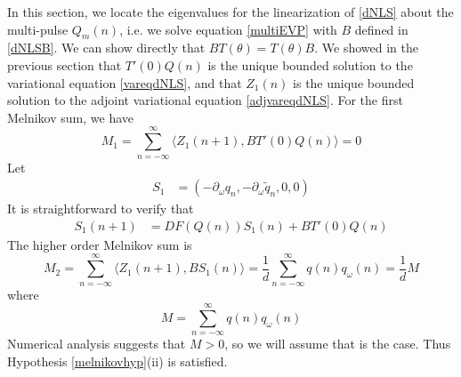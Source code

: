 \documentclass[12pt]{article}
\begin{document}
In this section, we locate the eigenvalues for the linearization of \eqref{dNLS} about the multi-pulse $Q_m(n)$, i.e. we solve equation \eqref{multiEVP} with $B$ defined in \eqref{dNLSB}. We can show directly that $B T(\theta) = T(\theta) B$. We showed in the previous section that $T'(0)Q(n)$ is the unique bounded solution to the variational equation \eqref{vareqdNLS}, and that $Z_1(n)$ is the unique bounded solution to the adjoint variational equation \eqref{adjvareqdNLS}. For the first Melnikov sum, we have
\[
M_1 = \sum_{n=-\infty}^\infty \langle Z_1(n+1), B T'(0)Q(n) \rangle = 0
\]
Let 
\begin{align}\label{dNLSdefS1}
S_1 &= (-\partial_\omega q_n, -\partial_\omega \tilde{q}_n, 0, 0)
\end{align}
It is straightforward to verify that
\begin{align*}
S_1(n+1) &= DF(Q(n)) S_1(n) + B T'(0) Q(n)
\end{align*}
The higher order Melnikov sum is
\[
M_2 = \sum_{n=-\infty}^\infty \langle Z_1(n+1), B S_1(n) \rangle =
\frac{1}{d} \sum_{n=-\infty}^\infty q(n) q_\omega(n) = \frac{1}{d}M
\]
where
\[
M = \sum_{n=-\infty}^\infty q(n) q_\omega(n)
\]
Numerical analysis suggests that $M > 0$, so we will assume that is the case. Thus Hypothesis \ref{melnikovhyp}(ii) is satisfied.
\end{document}
